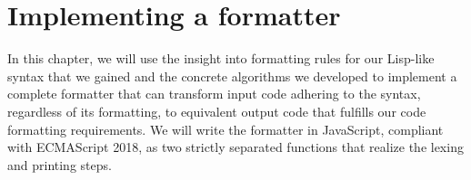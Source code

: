\chapter{Implementing a formatter}
In this chapter, we will use the insight into formatting rules for our Lisp-like syntax that we gained
and the concrete algorithms we developed to implement a complete formatter that can transform
input code adhering to the syntax, regardless of its formatting, to
equivalent output code that fulfills our code formatting requirements.
We will write the formatter in JavaScript, compliant with ECMAScript 2018,
as two strictly separated functions that realize the lexing and printing steps.




